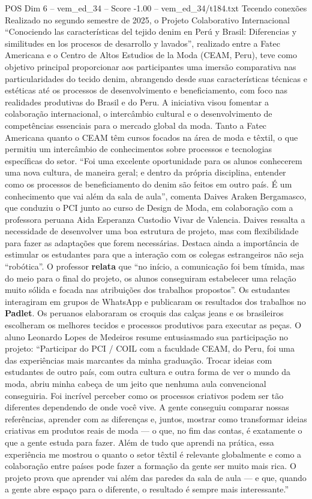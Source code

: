 \begin{textsample}{POS Dim 6 – vem\_ed\_34 – Score -1.00 – vem\_ed\_34/t184.txt}  \label{ex:f6_pos_159}
Tecendo conexões Realizado no segundo semestre de 2025, o Projeto Colaborativo Internacional “Conociendo las características del tejido denim en Perú y Brasil: Diferencias y similitudes en los procesos de desarrollo y lavados”, realizado entre a Fatec Americana e o Centro de Altos Estudios de la Moda (CEAM, Peru), teve como objetivo principal proporcionar aos participantes uma imersão comparativa nas particularidades do tecido denim, abrangendo desde suas características técnicas e estéticas até os processos de desenvolvimento e beneficiamento, com foco nas realidades produtivas do Brasil e do Peru.
A iniciativa visou fomentar a colaboração internacional, o intercâmbio cultural e o desenvolvimento de competências essenciais para o mercado global da moda.
Tanto a Fatec Americana quanto o CEAM têm cursos focados na área de moda e têxtil, o que permitiu um intercâmbio de conhecimentos sobre processos e tecnologias específicas do setor. “Foi uma excelente oportunidade para os alunos conhecerem uma nova cultura, de maneira geral; e dentro da própria disciplina, entender como os processos de beneficiamento do denim são feitos em outro país.
É um conhecimento que vai além da sala de aula”, comenta Daives Araken Bergamasco, que conduziu o PCI junto ao curso de Design de Moda, em colaboração com a professora peruana Aida Esperanza Custodio Vivar de Valencia.
Daives ressalta a necessidade de desenvolver uma boa estrutura de projeto, mas com flexibilidade para fazer as adaptações que forem necessárias.
Destaca ainda a importância de estimular os estudantes para que a interação com os colegas estrangeiros não seja “robótica”.
O professor \textbf{relata} que “no início, a comunicação foi bem tímida, mas do meio para o final do projeto, os alunos conseguiram estabelecer uma relação muito sólida e focada nas atribuições dos trabalhos propostos”.
Os estudantes interagiram em grupos de WhatsApp e publicaram os resultados dos trabalhos no \textbf{Padlet}.
Os peruanos elaboraram os croquis das calças jeans e os brasileiros escolheram os melhores tecidos e processos produtivos para executar as peças.
O aluno Leonardo Lopes de Medeiros resume entusiasmado sua participação no projeto: “Participar do PCI / COIL com a faculdade CEAM, do Peru, foi uma das experiências mais marcantes da minha graduação.
Trocar ideias com estudantes de outro país, com outra cultura e outra forma de ver o mundo da moda, abriu minha cabeça de um jeito que nenhuma aula convencional conseguiria.
Foi incrível perceber como os processos criativos podem ser tão diferentes dependendo de onde você vive.
A gente conseguiu comparar nossas referências, aprender com as diferenças e, juntos, mostrar como transformar ideias criativas em produtos reais de moda — o que, no fim das contas, é exatamente o que a gente estuda para fazer.
Além de tudo que aprendi na prática, essa experiência me mostrou o quanto o setor têxtil é relevante globalmente e como a colaboração entre países pode fazer a formação da gente ser muito mais rica.
O projeto prova que aprender vai além das paredes da sala de aula — e que, quando a gente abre espaço para o diferente, o resultado é sempre mais interessante.”

\end{textsample}
